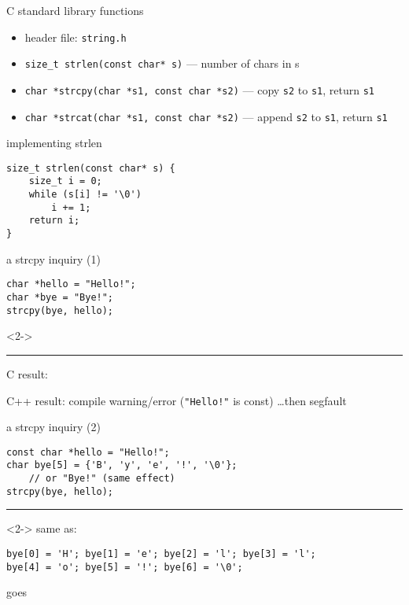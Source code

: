 \begin{frame}[fragile,label=cStrLib]{C standard library functions}
\lstset{
    language=C++,style=small
}
\begin{itemize}
    \item header file: \texttt{string.h}
    \vspace{.5cm}
    \item \lstinline|size_t strlen(const char* s)| --- number of chars in s
    \item \lstinline|char *strcpy(char *s1, const char *s2)| --- copy \texttt{s2} to \texttt{s1}, return \texttt{s1}
    \item \lstinline|char *strcat(char *s1, const char *s2)| --- append \texttt{s2} to \texttt{s1}, return \texttt{s1}
\end{itemize}
\end{frame}

\begin{frame}[fragile,label=strlenImpl]{implementing strlen}
\lstset{
    language=C++,style=small
}
\begin{lstlisting}
size_t strlen(const char* s) {
    size_t i = 0;
    while (s[i] != '\0')
        i += 1;
    return i;
}
\end{lstlisting}
\end{frame}

\begin{frame}[fragile,label=strcpyReadOnly]{a strcpy inquiry (1)}
\lstset{
    language=C++,style=small
}
\begin{lstlisting}
char *hello = "Hello!";
char *bye = "Bye!";
strcpy(bye, hello);
\end{lstlisting}
\begin{visibleenv}<2->
\hrule
C result: 

C++ result: compile warning/error (\texttt{"Hello!"} is const) \ldots then segfault
\end{visibleenv}
\end{frame}

\begin{frame}[fragile,label=strcpyTooSmall]{a strcpy inquiry (2)}
\lstset{
    language=C++,style=small
}
\begin{lstlisting}
const char *hello = "Hello!";
char bye[5] = {'B', 'y', 'e', '!', '\0'};
    // or "Bye!" (same effect)
strcpy(bye, hello);
\end{lstlisting}
\hrule
\vspace{.5cm}
\begin{visibleenv}<2->
same as:
\begin{lstlisting}
bye[0] = 'H'; bye[1] = 'e'; bye[2] = 'l'; bye[3] = 'l';
bye[4] = 'o'; bye[5] = '!'; bye[6] = '\0';
\end{lstlisting}
goes 
\end{visibleenv}
\end{frame}

